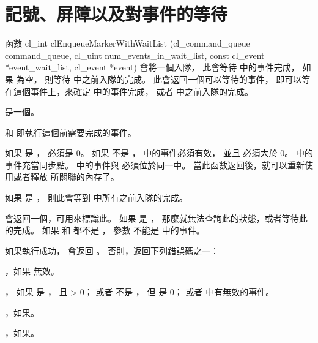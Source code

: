 \section{記號、屏障以及對事件的等待}

函數
\startclc
cl_int clEnqueueMarkerWithWaitList (cl_command_queue command_queue,
				cl_uint num_events_in_wait_list,
				const cl_event *event_wait_list,
				cl_event *event)
\stopclc
會將一個入隊，
此會等待  中的事件完成，
如果  為空，
則等待  中之前入隊的完成。
此會返回一個可以等待的事件，
即可以等在這個事件上，來確定  中的事件完成，
或者  中之前入隊的完成。

 是一個。

 和 
 即執行這個前需要完成的事件。

如果  是 ，
  必須是 0。
如果  不是 ，
  中的事件必須有效，
並且  必須大於 0。
  中的事件充當同步點。
  中的事件與  必須位於同一中。
當此函數返回後，就可以重新使用或者釋放  所關聯的內存了。

如果  是 ，
則此會等到  中所有之前入隊的完成。

 會返回一個，可用來標識此。
如果  是 ，
那麼就無法查詢此的狀態，或者等待此的完成。
如果  和  都不是 ，
參數  不能是  中的事件。

如果執行成功，  會返回 。
否則，返回下列錯誤碼之一：
\startigBase
\item {}，如果  無效。

\item {}，
如果  是 ，
且  > 0；
或者  不是 ，
但  是 0；
或者  中有無效的事件。

\item {}，如果\scdevfailres。

\item {}，如果\schostfailres。
\stopigBase
